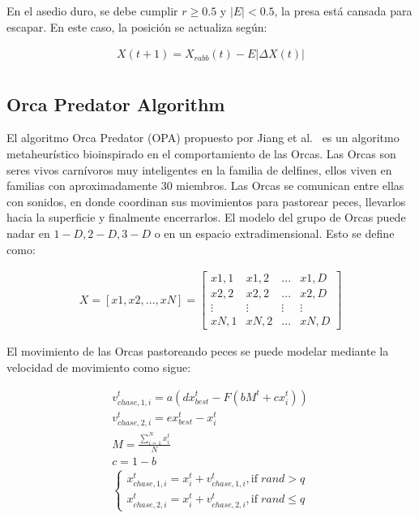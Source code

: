 \documentclass[conference]{IEEEtran}
\begin{document}
En el asedio duro, se debe cumplir $r \geq 0.5$ y $|E| < 0.5$, la presa está cansada para escapar. En este caso, la posición se actualiza según:

\begin{equation}
\begin{gathered}
X(t+1) = X_{rabb}(t) - E |\Delta X(t)| \\
\end{gathered}
\label{eq17}
\end{equation}

\subsection{Orca Predator Algorithm}

El algoritmo Orca Predator (OPA) propuesto por Jiang et al.~\cite{Jiang2022} es un algoritmo metaheurístico bioinspirado en el comportamiento de las Orcas. Las Orcas son seres vivos carnívoros muy inteligentes en la familia de delfines, ellos viven en familias con aproximadamente 30 miembros. Las Orcas se comunican entre ellas con sonidos, en donde coordinan sus movimientos para pastorear peces, llevarlos hacia la superficie y finalmente encerrarlos. El modelo del grupo de Orcas puede nadar en $1-D, 2-D, 3-D$ o en un espacio extradimensional. Esto se define como:

\begin{equation}
\begin{gathered}
X = [ x1, x2, ..., xN ] =\begin{bmatrix}
  x1,1 & x1,2 & ... & x1,D  \\
  x2,2 & x2,2 & ... & x2,D  \\
  \vdots & \vdots & \vdots & \vdots \\
  xN,1 & xN,2 & ... & xN,D
\end{bmatrix}
\end{gathered}
\label{eq18}
\end{equation}

El movimiento de las Orcas pastoreando peces se puede modelar mediante la velocidad de movimiento como sigue:

\begin{equation}
\begin{gathered}
v_{chase,1,i}^t = a ( d x_{best}^t - F (b M^t + c x_i^t)) \\
v_{chase,2,i}^t = e x_{best}^t - x_{i}^t \\
M = \frac{\sum_{i=1}^{N} x_i^t}{N} \\
c=1-b \\
\begin{cases}
  x_{chase,1,i}^t = x_{i}^t + v_{chase,1,i}^t , \text{if} \;rand > q \\
  x_{chase,2,i}^t = x_{i}^t + v_{chase,2,i}^t  , \text{if} \;rand \leq q
\end{cases}
\end{gathered}
\label{eq19}
\end{equation}
\end{document}
